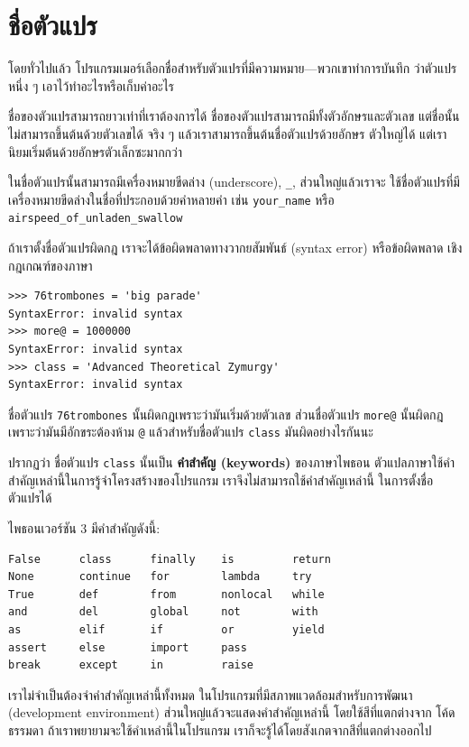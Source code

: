 \section{ชื่อตัวแปร} %

โดยทั่วไปแล้ว โปรแกรมเมอร์เลือกชื่อสำหรับตัวแปรที่มีความหมาย---พวกเขาทำการบันทึก
ว่าตัวแปรหนึ่ง ๆ เอาไว้ทำอะไรหรือเก็บค่าอะไร

ชื่อของตัวแปรสามารถยาวเท่าที่เราต้องการได้ ชื่อของตัวแปรสามารถมีทั้งตัวอักษรและตัวเลข
แต่ชื่อนั้นไม่สามารถขึ้นต้นด้วยตัวเลขได้  จริง ๆ แล้วเราสามารถขึ้นต้นชื่อตัวแปรด้วยอักษร
ตัวใหญ่ได้ แต่เรานิยมเริ่มต้นด้วยอักษรตัวเล็กซะมากกว่า

ในชื่อตัวแปรนั้นสามารถมีเครื่องหมายขีดล่าง (underscore), \verb|_|, ส่วนใหญ่แล้วเราจะ
ใช้ชื่อตัวแปรที่มีเครื่องหมายขีดล่างในชื่อที่ประกอบด้วยคำหลายคำ เช่น \verb|your_name| หรือ
 \verb|airspeed_of_unladen_swallow|

ถ้าเราตั้งชื่อตัวแปรผิดกฎ เราจะได้ข้อผิดพลาดทางวากยสัมพันธ์ (syntax error) หรือข้อผิดพลาด
เชิงกฎเกณฑ์ของภาษา

\begin{verbatim}
>>> 76trombones = 'big parade'
SyntaxError: invalid syntax
>>> more@ = 1000000
SyntaxError: invalid syntax
>>> class = 'Advanced Theoretical Zymurgy'
SyntaxError: invalid syntax
\end{verbatim}
%
ชื่อตัวแปร {\tt 76trombones} นั้นผิดกฎเพราะว่ามันเริ่มด้วยตัวเลข
ส่วนชื่อตัวแปร {\tt more@} นั้นผิดกฎเพราะว่ามันมีอักขระต้องห้าม {\tt @}
แล้วสำหรับชื่อตัวแปร {\tt class} มันผิดอย่างไรกันนะ

ปรากฏว่า ชื่อตัวแปร {\tt class} นั้นเป็น {\bf คำสำคัญ (keywords)} ของภาษาไพธอน
ตัวแปลภาษาใช้คำสำคัญเหล่านี้ในการรู้จำโครงสร้างของโปรแกรม เราจึงไม่สามารถใช้คำสำคัญเหล่านี้
ในการตั้งชื่อตัวแปรได้

ไพธอนเวอร์ชัน 3 มีคำสำคัญดังนี้:

\begin{verbatim}
False      class      finally    is         return
None       continue   for        lambda     try
True       def        from       nonlocal   while
and        del        global     not        with
as         elif       if         or         yield
assert     else       import     pass
break      except     in         raise
\end{verbatim}
%
เราไม่จำเป็นต้องจำคำสำคัญเหล่านี้ทั้งหมด ในโปรแกรมที่มีสภาพแวดล้อมสำหรับการพัฒนา 
(development environment) ส่วนใหญ่แล้วจะแสดงคำสำคัญเหล่านี้ โดยใช้สีที่แตกต่างจาก
โค้ดธรรมดา ถ้าเราพยายามจะใช้คำเหล่านี้ในโปรแกรม เราก็จะรู้ได้โดยสังเกตจากสีที่แตกต่างออกไป


